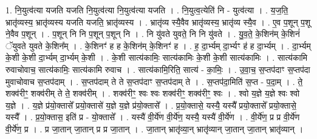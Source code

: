 \documentclass[17pt]{extarticle}
\begin{document}
1. नि॒युत्व॑त्या यजति यजति नि॒युत्व॑त्या नि॒युत्व॑त्या यजति । . नि॒युत्व॒त्येति॑ नि - युत्व॑त्या । . य॒ज॒ति॒ भ्रातृ॑व्यस्य॒ भ्रातृ॑व्यस्य यजति यजति॒ भ्रातृ॑व्यस्य । . भ्रातृ॑व्य स्यै॒वैव भ्रातृ॑व्यस्य॒ भ्रातृ॑व्य स्यै॒व । . ए॒व प॒शून् प॒शू ने॒वैव प॒शून् । . प॒शून् नि नि प॒शून् प॒शून् नि । . नि यु॑वते युवते॒ नि नि यु॑वते । . यु॒व॒ते॒ के॒शिन॑म् के॒शिनं॑ ॅयुवते युवते के॒शिन᳚म् । . के॒शिनꣳ॑ ह ह के॒शिन॑म् के॒शिनꣳ॑ ह । . ह॒ दा॒र्भ्यम् दा॒र्भ्यꣳ ह॑ ह दा॒र्भ्यम् । . दा॒र्भ्यम् के॒शी के॒शी दा॒र्भ्यम् दा॒र्भ्यम् के॒शी । . के॒शी सात्य॑कामिः॒ सात्य॑कामिः के॒शी के॒शी सात्य॑कामिः । . सात्य॑कामि रुवाचोवाच॒ सात्य॑कामिः॒ सात्य॑कामि रुवाच । . सात्य॑कामि॒रिति॒ सात्य॑ - का॒मिः॒ । . उ॒वा॒च॒ स॒प्तप॑दाꣳ स॒प्तप॑दा मुवाचोवाच स॒प्तप॑दाम् । . स॒प्तप॑दाम् ते ते स॒प्तप॑दाꣳ स॒प्तप॑दाम् ते । . स॒प्तप॑दा॒मिति॑ स॒प्त - प॒दा॒म् । . ते॒ शक्व॑रीꣳ॒॒ शक्व॑रीम् ते ते॒ शक्व॑रीम् । . शक्व॑रीꣳ॒॒ श्वः श्वः शक्व॑रीꣳ॒॒ शक्व॑रीꣳ॒॒ श्वः । . श्वो य॒ज्ञे य॒ज्ञे श्वः श्वो य॒ज्ञे । . य॒ज्ञे प्र॑यो॒क्तासे᳚ प्रयो॒क्तासे॑ य॒ज्ञे य॒ज्ञे प्र॑यो॒क्तासे᳚ । . प्र॒यो॒क्तासे॒ यस्यै॒ यस्यै᳚ प्रयो॒क्तासे᳚ प्रयो॒क्तासे॒ यस्यै᳚ । . प्र॒यो॒क्तास॒ इति॑ प्र - यो॒क्तासे᳚ । . यस्यै॑ वी॒र्ये॑ण वी॒र्ये॑ण॒ यस्यै॒ यस्यै॑ वी॒र्ये॑ण । . वी॒र्ये॑ण॒ प्र प्र वी॒र्ये॑ण वी॒र्ये॑ण॒ प्र । . प्र जा॒तान् जा॒तान् प्र प्र जा॒तान् । . जा॒तान् भ्रातृ॑व्या॒न् भ्रातृ॑व्यान् जा॒तान् जा॒तान् भ्रातृ॑व्यान् । \newline
\end{document}
